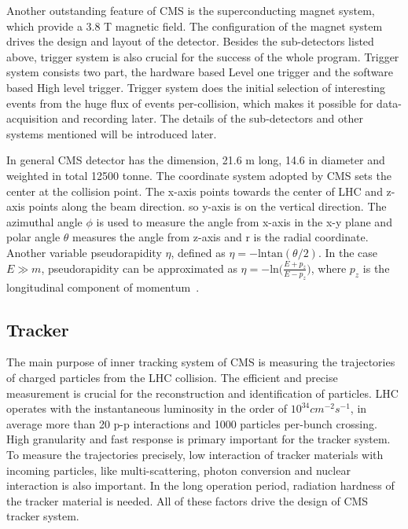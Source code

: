 Another outstanding feature of CMS is the superconducting magnet system, which provide a 3.8 T magnetic field. The configuration of the magnet system drives the design and layout of the detector. Besides the sub-detectors listed above, trigger system is also crucial for the success of the whole program. Trigger system consists two part, the hardware based Level one trigger and the software based High level trigger. Trigger system does the initial selection of interesting events from the huge flux of events per-collision, which makes it possible for data-acquisition and recording later. The details of the sub-detectors and other systems mentioned will be introduced later. 

In general CMS detector has the dimension, 21.6 m long, 14.6 in diameter and weighted in total 12500 tonne. The coordinate system adopted by CMS sets the center at the collision point. The x-axis points towards the center of LHC and z-axis points along the beam direction. so y-axis is on the vertical direction. The azimuthal angle $\phi$ is used to measure the angle from x-axis in the x-y plane and polar angle $\theta$ measures the angle from z-axis and r is the radial coordinate. Another variable pseudorapidity $\eta$, defined as $\eta=-\textrm{ln}\textrm{tan}(\theta/2)$. In the case $E\gg m$, pseudorapidity can be approximated as $\eta=-\textrm{ln}\big(\frac{E+p_{z}}{E-p_{z}}\big)$, where $p_{z}$ is the longitudinal component of momentum~\cite{CMS_experiment}. 

\subsection{Tracker}
The main purpose of inner tracking system of CMS is measuring the trajectories of charged particles from the LHC collision. The efficient and precise measurement is crucial for the reconstruction and identification of particles. LHC operates with the instantaneous luminosity in the order of $10^{34}cm^{-2}s^{-1}$, in average more than 20 p-p interactions and 1000 particles per-bunch crossing. High granularity and fast response is primary important for the tracker system. To measure the trajectories precisely, low interaction of tracker materials with incoming particles, like multi-scattering, photon conversion and nuclear interaction is also important. In the long operation period, radiation hardness of the tracker material is needed. All of these factors drive the design of CMS tracker system.

